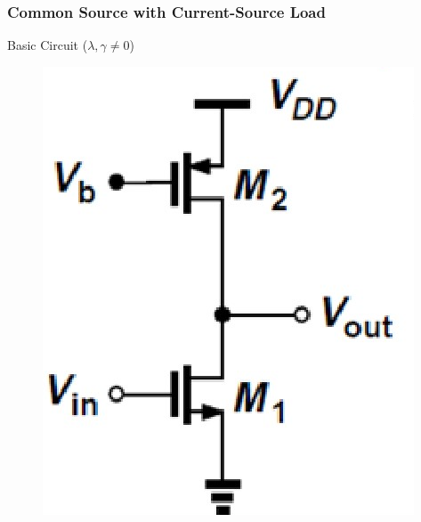 \documentclass{beamer}
\begin{document}
\begin{frame}
    \frametitle{Common Source with Current-Source Load}
    \begin{minipage}{0.45\linewidth}
        Basic Circuit ($\lambda, \gamma\not= 0$)
        \begin{figure}[H]
            \centering
            \includegraphics[width=0.8\linewidth]{common-source-C}
        \end{figure}
         

\end{minipage}
\end{frame}
\end{document}
